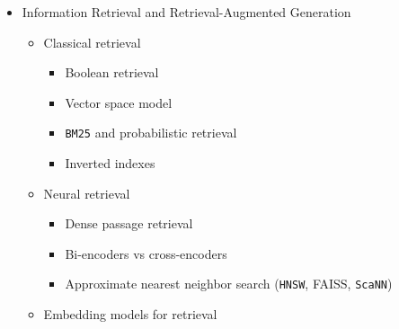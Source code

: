 \documentclass[
]{article}
\providecommand{\tightlist}{%
  \setlength{\itemsep}{0pt}\setlength{\parskip}{0pt}}
\begin{document}
\begin{itemize}
\begin{itemize}
    \begin{itemize}
    \tightlist
    \item
      Natural language understanding
    \item
      Dialogue manager
    \item
      Natural language generation
    \item
      Speech integration
    \end{itemize}
  \item
    Modern \texttt{LLM}-based dialogue

    \begin{itemize}
    \tightlist
    \item
      In-context learning for dialogue
    \item
      Tool use and function calling
    \item
      Memory and conversation history
    \end{itemize}
  \item
    Evaluation

    \begin{itemize}
    \tightlist
    \item
      Task completion metrics
    \item
      Engagement and quality metrics
    \item
      Safety and toxicity
    \end{itemize}
  \end{itemize}
\item
  Information Retrieval and Retrieval-Augmented Generation

  \begin{itemize}
  \tightlist
  \item
    Classical retrieval

    \begin{itemize}
    \tightlist
    \item
      Boolean retrieval
    \item
      Vector space model
    \item
      \texttt{BM25} and probabilistic retrieval
    \item
      Inverted indexes
    \end{itemize}
  \item
    Neural retrieval

    \begin{itemize}
    \tightlist
    \item
      Dense passage retrieval
    \item
      Bi-encoders vs cross-encoders
    \item
      Approximate nearest neighbor search (\texttt{HNSW}, FAISS,
      \texttt{ScaNN})
    \end{itemize}
  \item
    Embedding models for retrieval


\end{itemize}
\end{itemize}
\end{document}
